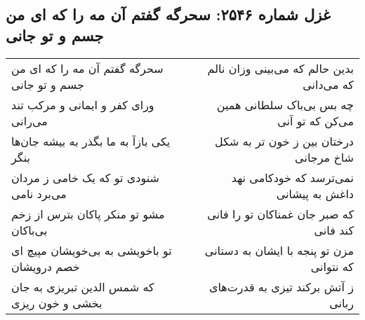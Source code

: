 \begin{center}
\section*{غزل شماره ۲۵۴۶: سحرگه گفتم آن مه را که ای من جسم و تو جانی}
\label{sec:2546}
\begin{longtable}{l p{0.5cm} r}
سحرگه گفتم آن مه را که ای من جسم و تو جانی
&&
بدین حالم که می‌بینی وزان نالم که می‌دانی
\\
ورای کفر و ایمانی و مرکب تند می‌رانی
&&
چه بس بی‌باک سلطانی همین می‌کن که تو آنی
\\
یکی بازآ به ما بگذر به بیشه جان‌ها بنگر
&&
درختان بین ز خون تر به شکل شاخ مرجانی
\\
شنودی تو که یک خامی ز مردان می‌برد نامی
&&
نمی‌ترسد که خودکامی نهد داغش به پیشانی
\\
مشو تو منکر پاکان بترس از زخم بی‌باکان
&&
که صبر جان غمناکان تو را فانی کند فانی
\\
تو باخویشی به بی‌خویشان مپیچ ای خصم درویشان
&&
مزن تو پنجه با ایشان به دستانی که نتوانی
\\
که شمس الدین تبریزی به جان بخشی و خون ریزی
&&
ز آتش برکند تیزی به قدرت‌های ربانی
\\
\end{longtable}
\end{center}
